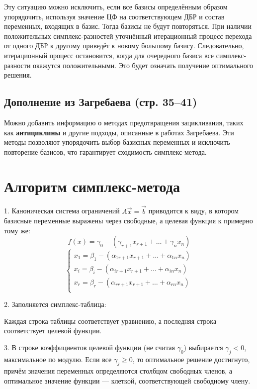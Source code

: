 \documentclass[17pt]{extarticle}
\begin{document}
Эту ситуацию можно исключить, если все базисы определённым образом упорядочить, используя значение ЦФ на соответствующем ДБР и состав переменных, входящих в базис. Тогда базисы не будут повторяться. При наличии положительных симплекс-разностей уточнённый итерационный процесс перехода от одного ДБР к другому приведёт к новому большому базису. Следовательно, итерационный процесс остановится, когда для очередного базиса все симплекс-разности окажутся положительными. Это будет означать получение оптимального решения.

\subsection{Дополнение из Загребаева (стр. 35–41)}
Можно добавить информацию о методах предотвращения зацикливания, таких как \textbf{антициклины} и другие подходы, описанные в работах Загребаева. Эти методы позволяют упорядочить выбор базисных переменных и исключить повторение базисов, что гарантирует сходимость симплекс-метода.




\section{Алгоритм симплекс-метода}

1. Каноническая система ограничений \( A\vec{x} = \vec{b} \) приводится к виду, в котором базисные переменные выражены через свободные, а целевая функция к примерно тому же:
\[
    f(x) = \gamma_0 - (\gamma_{r+1}x_{r+1} + \dots + \gamma_n x_n)
\]
\[
    \begin{cases}
        x_1 = \beta_1 - (\alpha_{1 r+1}x_{r+1} + \dots + \alpha_{1n}x_n) \\
        x_i = \beta_i - (\alpha_{i r+1}x_{r+1} + \dots + \alpha_{in}x_n) \\
        x_r = \beta_r - (\alpha_{r r+1}x_{r+1} + \dots + \alpha_{rn}x_n) \\
    \end{cases}
\]

2. Заполняется симплекс-таблица:


Каждая строка таблицы соответствует уравнению, а последняя строка соответствует целевой функции.

3. В строке коэффициентов целевой функции (не считая \( \gamma_0 \)) выбирается \( \gamma_j < 0 \), максимальное по модулю.
Если все \( \gamma_j \ge 0 \), то оптимальное решение достигнуто, причём значения переменных определяются столбцом свободных членов, а оптимальное значение функции — клеткой, соответствующей свободному члену.
\end{document}
